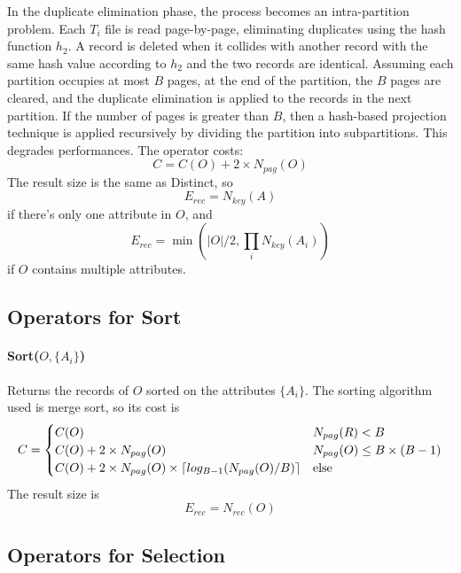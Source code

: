 In the duplicate elimination phase, the process becomes an intra-partition problem. Each $T_i$ file is read page-by-page, eliminating duplicates using the hash function $h_2$. A record is deleted when it collides with another record with the same hash value according to $h_2$ and the two records are identical. Assuming each partition occupies at most $B$ pages, at the end of the partition, the $B$ pages are cleared, and the duplicate elimination is applied to the records in the next partition. If the number of pages is greater than $B$, then a hash-based projection technique is applied recursively by dividing the partition into subpartitions. This degrades performances. The operator costs:
\begin{equation*}
    C = C(O) + 2 \times N_{pag}(O)
\end{equation*}
The result size is the same as Distinct, so
\begin{equation*}
    E_{rec} = N_{key}(A)
\end{equation*}
if there's only one attribute in $O$, and
\begin{equation*}
    E_{rec} = \min(|O|/2, \prod_i N_{key}(A_i))
\end{equation*}
if $O$ contains multiple attributes.

\subsection{Operators for Sort}

\paragraph{Sort($O, \{A_i\}$)}
Returns the records of $O$ sorted on the attributes $\{A_i\}$. The sorting algorithm used is merge sort, so its cost is
\begin{equation*}
    C = \begin{cases}
        C(O) & N_{pag}(R) < B \\
        C(O) + 2 \times N_{pag}(O) & N_{pag}(O) \leq B \times (B-1) \\
        C(O) + 2 \times N_{pag}(O) \times \left\lceil log_{B-1}(N_{pag}(O) / B)\right\rceil & \text{else}
    \end{cases}
\end{equation*}
The result size is
\begin{equation*}
    E_{rec} = N_{rec}(O)
\end{equation*}

\subsection{Operators for Selection}

